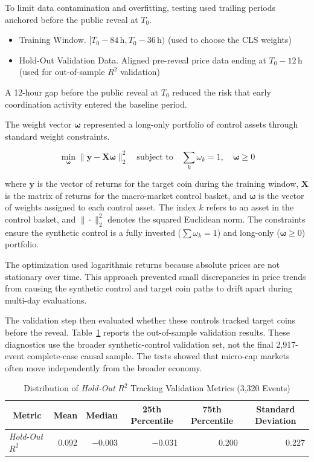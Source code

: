 To limit data contamination and overfitting, testing used trailing periods anchored before the public reveal at $T_0$.
\begin{itemize}
    \item Training Window. $[T_0 - 84\,\mathrm{h}, T_0 - 36\,\mathrm{h})$ (used to choose the CLS weights)
    \item Hold-Out Validation Data. Aligned pre-reveal price data ending at $T_0 - 12\,\mathrm{h}$ (used for out-of-sample $R^2$ validation)
\end{itemize}

A 12-hour gap before the public reveal at $T_0$ reduced the risk that early coordination activity entered the baseline period.

The weight vector $\boldsymbol{\omega}$ represented a long-only portfolio of control assets through standard weight constraints.

\begin{equation}
    \min_{\boldsymbol{\omega}} \| \mathbf{y} - \mathbf{X}\boldsymbol{\omega} \|_2^2
    \quad \text{subject to} \quad
    \sum_{k} \omega_k = 1, \quad \boldsymbol{\omega} \geq 0
\end{equation}

where $\mathbf{y}$ is the vector of returns for the target coin during the training window, $\mathbf{X}$ is the matrix of returns for the macro-market control basket, and $\boldsymbol{\omega}$ is the vector of weights assigned to each control asset. The index $k$ refers to an asset in the control basket, and $\|\cdot\|_2^2$ denotes the squared Euclidean norm. The constraints ensure the synthetic control is a fully invested ($\sum \omega_k = 1$) and long-only ($\boldsymbol{\omega} \geq 0$) portfolio.

The optimization used logarithmic returns because absolute prices are not stationary over time. This approach prevented small discrepancies in price trends from causing the synthetic control and target coin paths to drift apart during multi-day evaluations.

The validation step then evaluated whether these controls tracked target coins before the reveal. Table~\ref{tab:app-holdout-r2-validation} reports the out-of-sample validation results. These diagnostics use the broader synthetic-control validation set, not the final 2,917-event complete-case causal sample. The tests showed that micro-cap markets often move independently from the broader economy.

\begin{table}[htbp]
\centering
\caption{Distribution of \textit{Hold-Out} $R^2$ Tracking Validation Metrics (3{,}320 Events)}
\label{tab:app-holdout-r2-validation}
\small
\begin{tabular}{|l|r|r|r|r|r|}
\toprule
\multicolumn{1}{|c|}{Metric} & \multicolumn{1}{c|}{Mean} & \multicolumn{1}{c|}{Median} & \multicolumn{1}{c|}{25th Percentile} & \multicolumn{1}{c|}{75th Percentile} & \multicolumn{1}{c|}{Standard Deviation} \\
\midrule
\textit{Hold-Out} $R^2$ & 0.092 & $-$0.003 & $-$0.031 & 0.200 & 0.227 \\
\bottomrule
\end{tabular}
\datasetsource
\end{table}

